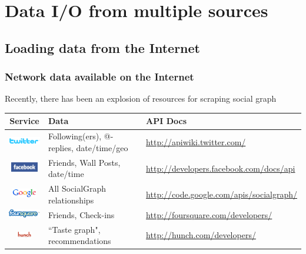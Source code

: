 \documentclass[xcolor=dvipsnames, 9pt]{beamer}
\begin{document}


\section{Data I/O from multiple sources} %
\label{sec:data_i_o_from_multiple_sources}

\subsection{Loading data from the Internet} %
\label{sub:loading_data_from_the_internet}

\begin{frame}[fragile]
    \frametitle{Network data available on the Internet}
    Recently, there has been an explosion of resources for scraping social graph
    \begin{table}
        \centering
        \scriptsize{
        \begin{tabular*}{.99\textwidth}{c|l|l}
        Service & Data & API Docs \\ \hline \hline
        \includegraphics[height=4mm]{../images/logos/twitter_logo.png} & Following(ers), @-replies, date/time/geo & \url{http://apiwiki.twitter.com/} \\ \hline
        \includegraphics[height=4mm]{../images/logos/facebook_logo.jpg} & Friends, Wall Posts, date/time & \url{http://developers.facebook.com/docs/api} \\ \hline
        \includegraphics[height=4mm]{../images/logos/Newgooglelogo.png} & All SocialGraph relationships & \url{http://code.google.com/apis/socialgraph/} \\ \hline
        \includegraphics[height=4mm]{../images/logos/foursquare.png} & Friends, Check-ins & \url{http://foursquare.com/developers/} \\ \hline
        \includegraphics[height=3mm]{../images/logos/Hunch_com_logo.png} & ``Taste graph", recommendations  & \url{http://hunch.com/developers/} \\ \hline

\end{tabular*}}
\end{table}
\end{frame}
\end{document}
